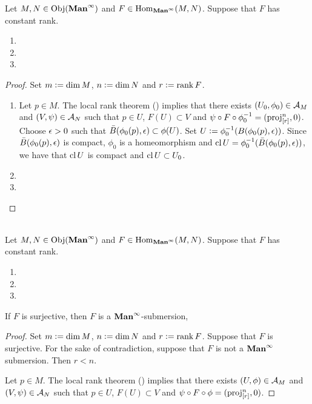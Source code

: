 \documentclass{book}
\begin{document}
	\begin{ex}
		Let $M,N \in \operatorname{Obj}(\operatorname*{\text{\textbf{Man}}^{\infty}})$ and $F \in \operatorname{Hom}_{\operatorname*{\text{\textbf{Man}}^{\infty}}}(M,N)$. Suppose that $F$ has constant rank. 
		\begin{enumerate}
			\item 
			\item 
			\item 
		\end{enumerate}
	\end{ex}

	\begin{proof} Set $m \vcentcolon= \dim M$, $n \vcentcolon= \dim N$ and $r \vcentcolon= \operatorname{\text{rank}} F$.
		\begin{enumerate}
			\item Let $p \in M$. The local rank theorem () implies that there exists $(U_0, \phi_0) \in \mathcal{A}_M$ and $(V, \psi) \in \mathcal{A}_N$ such that $p \in U$, $F(U) \subset V$ and $\psi \circ F \circ \phi_0^{-1} = (\operatorname{\text{proj}}^n_{[r]}, 0)$. Choose $\epsilon > 0$ such that $\bar{B}(\phi_0(p), \epsilon) \subset \phi(U)$. Set $U \vcentcolon= \phi_0^{-1}(B(\phi_0(p), \epsilon))$. Since $\bar{B}(\phi_0(p), \epsilon)$ is compact, $\phi_0$ is a homeomorphism and $\operatorname{cl} U = \phi_0^{-1}(\bar{B}(\phi_0(p), \epsilon))$, we have that $\operatorname{cl} U$ is compact and $\operatorname{cl} U \subset U_0$.
			\item 
			\item 
		\end{enumerate}
	\end{proof}
	
	\begin{ex}   \\
		Let $M,N \in \operatorname{Obj}(\operatorname*{\text{\textbf{Man}}^{\infty}})$ and $F \in \operatorname{Hom}_{\operatorname*{\text{\textbf{Man}}^{\infty}}}(M,N)$. Suppose that $F$ has constant rank. 
		\begin{enumerate}
			\item 
			\item 
			\item 
		\end{enumerate}
		If $F$ is surjective, then $F$ is a $\operatorname*{\text{\textbf{Man}}^{\infty}}$-submersion,
	\end{ex}

	\begin{proof}
		Set $m \vcentcolon= \dim M$, $n \vcentcolon= \dim N$ and $r \vcentcolon= \operatorname{\text{rank}} F$. Suppose that $F$ is surjective. For the sake of contradiction, suppose that $F$ is not a $\operatorname*{\text{\textbf{Man}}^{\infty}}$ submersion. Then $r < n$. 
		
		
		Let $p \in M$. The local rank theorem () implies that there exists $(U, \phi) \in \mathcal{A}_M$ and $(V, \psi) \in \mathcal{A}_N$ such that $p \in U$, $F(U) \subset V$ and $\psi \circ F \circ \phi = (\operatorname{\text{proj}}^n_{[r]}, 0)$. 
		
		
	\end{proof}
\end{document}
